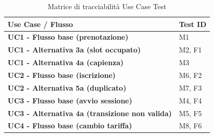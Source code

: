 \begin{table}[H]
    \centering
    \small
    \renewcommand{\arraystretch}{1.2}
    \begin{tabularx}{\textwidth}{|>{\bfseries}l|X|}
        \hline
        Use Case / Flusso & Test ID \\ \hline
        UC1 - Flusso base (prenotazione) & M1 \\ \hline
        UC1 - Alternativa 3a (slot occupato) & M2, F1 \\ \hline
        UC1 - Alternativa 4a (capienza) & M3 \\ \hline
        UC2 - Flusso base (iscrizione) & M6, F2 \\ \hline
        UC2 - Alternativa 5a (duplicato) & M7, F3 \\ \hline
        UC3 - Flusso base (avvio sessione) & M4, F4 \\ \hline
        UC3 - Alternativa 4a (transizione non valida) & M5, F5 \\ \hline
        UC4 - Flusso base (cambio tariffa) & M8, F6 \\ \hline
    \end{tabularx}
    \caption{Matrice di tracciabilità Use Case \textrightarrow{} Test}
    \label{tab:traceability}
\end{table}
